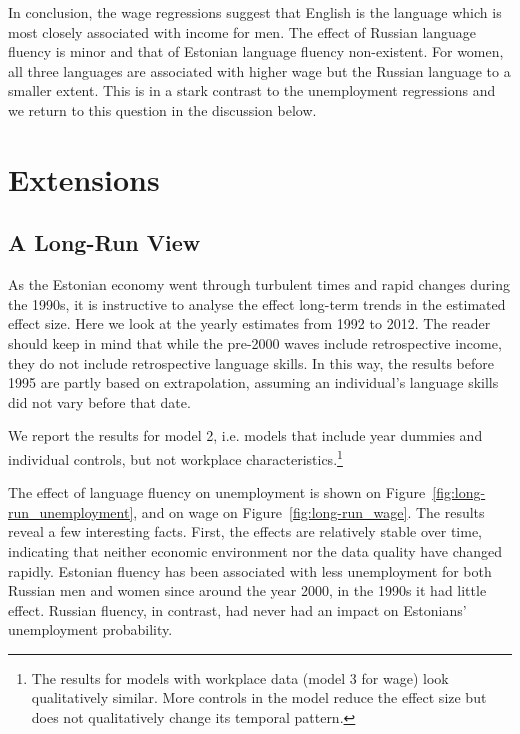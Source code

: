 \documentclass[12pt, a4paper]{article}
\begin{document}
In conclusion, the wage regressions suggest that English is the
language which is most closely associated with income for men. The effect of Russian language fluency is minor and
that of Estonian language fluency non-existent. For women, all three languages are
associated with higher wage but the Russian language to a smaller extent.
This is in a stark contrast to the unemployment regressions and we return to
this question in the discussion below.


\section{Extensions}
\label{sec:extensions}

\subsection{A Long-Run View}
\label{sec:long-run}              

As the Estonian economy went through turbulent times and rapid changes
during the 1990s, it is instructive to analyse the effect long-term
trends in the estimated effect size. Here we look at the yearly estimates from 1992 to 2012.
The reader should keep in mind that while the pre-2000 waves include retrospective income, they do not include retrospective language skills. In this way, the results before
1995 are partly based on extrapolation, assuming an individual's language
skills did not vary before that date.

We report the results for model 2, i.e. models that include year
dummies and individual controls, but not workplace
characteristics.\footnote{The results for models with workplace data (model
 3 for wage)
 look qualitatively similar. More controls in the model reduce the effect size but does not qualitatively
 change its temporal pattern.}

The effect of language fluency on unemployment is shown on
Figure~\ref{fig:long-run_unemployment}, and on wage on
Figure~\ref{fig:long-run_wage}.
The results reveal a few interesting facts. First, the effects are
relatively stable over time, indicating that neither economic
environment nor the data quality have changed rapidly. Estonian
fluency has been associated with less unemployment for both Russian men and
women since around the year 2000, in the 1990s it had little effect. Russian fluency,
in contrast, had never had an impact on Estonians' unemployment probability.
\end{document}
